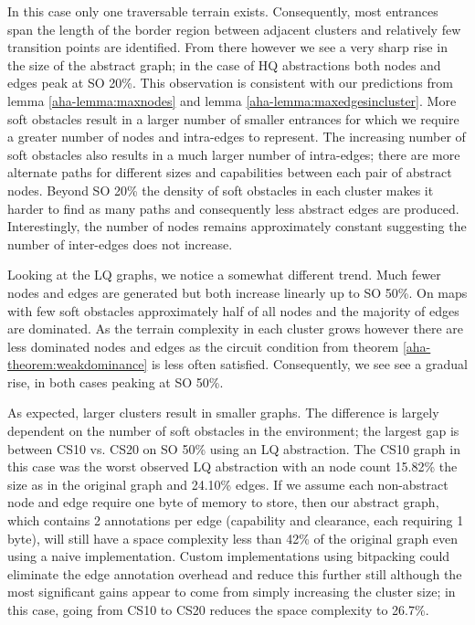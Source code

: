 In this case only one traversable terrain exists.
Consequently, most entrances span the length of the border region between adjacent clusters and relatively few transition points are identified. 
From there however we see a very sharp rise in the size of the abstract graph; in the case of HQ abstractions both nodes and edges peak at SO 20\%. 
This observation is consistent with our predictions from lemma \ref{aha-lemma:maxnodes} and lemma \ref{aha-lemma:maxedgesincluster}.
More soft obstacles result in a larger number of smaller entrances for which we require a greater number of nodes and intra-edges to represent.
The increasing number of soft obstacles also results in a much larger number of intra-edges; there are more alternate paths for different sizes and capabilities between each pair of abstract nodes.
Beyond SO 20\% the density of soft obstacles in each cluster makes it harder to find as many paths and consequently less abstract edges are produced. 
Interestingly, the number of nodes remains approximately constant suggesting the number of inter-edges does not increase.
\par \indent
Looking at the LQ graphs, we notice a somewhat different trend. 
Much fewer nodes and edges are generated but both increase linearly up to SO 50\%. 
On maps with few soft obstacles approximately half of all nodes and the majority of edges are dominated. 
As the terrain complexity in each cluster grows however there are less dominated nodes and edges as the circuit condition from theorem \ref{aha-theorem:weakdominance} is less often satisfied.
Consequently, we see see a gradual rise, in both cases peaking at SO 50\%.
\par \indent
As expected, larger clusters result in smaller graphs. 
The difference is largely dependent on the number of soft obstacles in the environment; the largest gap is between CS10 vs. CS20 on SO 50\% using an LQ abstraction.
The CS10 graph in this case was the worst observed LQ abstraction with an node count 15.82\% the size as in the original graph and 24.10\% edges.
If we assume each non-abstract node and edge require one byte of memory to store, then our abstract graph, which contains 2 annotations per edge (capability and clearance, each requiring 1 byte), will still have a space complexity less than 42\% of the original graph even using a naive implementation. 
Custom implementations using bitpacking could eliminate the edge annotation overhead and reduce this further still although the most significant gains appear to come from simply increasing the cluster size; in this case, going from CS10 to CS20 reduces the space complexity to 26.7\%.
